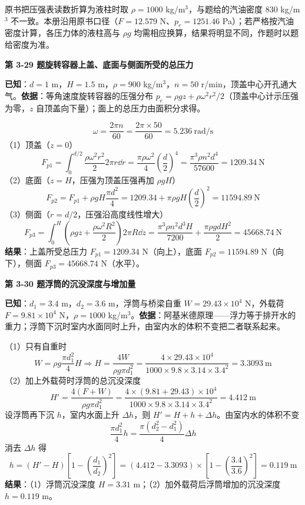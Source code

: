 \begin{yicuo}
原书把压强表读数折算为液柱时取 $\rho=1000$ kg/m$^3$，与题给的汽油密度 830 kg/m$^3$ 不一致。本册沿用原书口径（$F=12.579$ N、$p_e=1251.46$ Pa）；若严格按汽油密度计算，各压力体的液柱高与 $\rho g$ 均需相应换算，结果将明显不同，作题时以题给密度为准。
\end{yicuo}

\noindent\textbf{第 3-29 题\quad 旋转容器上盖、底面与侧面所受的总压力}

\begin{jie}
\textbf{已知}：$d=1$ m，$H=1.5$ m，$\rho=900$ kg/m$^3$，$n=50$ r/min，顶盖中心开孔通大气。\textbf{依据}：等角速度旋转容器的压强分布 $p_e=\rho gz+\rho\omega^2r^2/2$（顶盖中心计示压强为零，$z$ 自顶盖向下量）；面上的总压力由面积分求得。

\[ \omega=\frac{2\pi n}{60}=\frac{2\pi\times50}{60}=5.236\ \mathrm{rad/s} \]
（1）顶盖（$z=0$）
\[ F_{p1}=\int_0^{d/2}\frac{\rho\omega^2r^2}{2}2\pi r\dd r=\frac{\pi\rho\omega^2}{4}\left(\frac{d}{2}\right)^4=\frac{\pi^3\rho n^2d^4}{57600}=1209.34\ \mathrm{N} \]
（2）底面（$z=H$，压强为顶盖压强再加 $\rho gH$）
\[ F_{p2}=F_{p1}+\rho gH\frac{\pi d^2}{4}=1209.34+\pi\rho gH\left(\frac{d}{2}\right)^2=11594.89\ \mathrm{N} \]
（3）侧面（$r=d/2$，压强沿高度线性增大）
\[ F_{p3}=\int_0^{H}\left(\rho gz+\frac{\rho\omega^2R^2}{2}\right)2\pi R\dd z=\frac{\pi^3\rho n^2d^3H}{7200}+\frac{\pi\rho gdH^2}{2}=45668.74\ \mathrm{N} \]
\textbf{结果}：上盖所受总压力 $F_{p1}=1209.34$ N（向上），底面 $F_{p2}=11594.89$ N（向下），侧面 $F_{p3}=45668.74$ N（水平）。
\end{jie}

\noindent\textbf{第 3-30 题\quad 浮筒的沉没深度与增加量}

\begin{jie}
\textbf{已知}：$d_1=3.4$ m，$d_2=3.6$ m，浮筒与桥梁自重 $W=29.43\times10^4$ N，外载荷 $F=9.81\times10^4$ N，$\rho=1000$ kg/m$^3$。\textbf{依据}：阿基米德原理——浮力等于排开水的重力；浮筒下沉时室内水面同时上升，由室内水的体积不变把二者联系起来。

（1）只有自重时
\[ W=\rho g\frac{\pi d_1^2}{4}H\Rightarrow H=\frac{4W}{\rho g\pi d_1^2}=\frac{4\times29.43\times10^4}{1000\times9.8\times3.14\times3.4^2}=3.3093\ \mathrm{m} \]
（2）加上外载荷时浮筒的总沉没深度
\[ H'=\frac{4(F+W)}{\rho g\pi d_1^2}=\frac{4\times(9.81+29.43)\times10^4}{1000\times9.8\times3.14\times3.4^2}=4.412\ \mathrm{m} \]
设浮筒再下沉 $h$，室内水面上升 $\Delta h$，则 $H'=H+h+\Delta h$。由室内水的体积不变
\[ \frac{\pi d_1^2}{4}h=\frac{\pi(d_2^2-d_1^2)}{4}\Delta h \]
消去 $\Delta h$ 得
\[ h=(H'-H)\left[1-\left(\frac{d_1}{d_2}\right)^2\right]=(4.412-3.3093)\times\left[1-\left(\frac{3.4}{3.6}\right)^2\right]=0.119\ \mathrm{m} \]
\textbf{结果}：（1）浮筒沉没深度 $H=3.31$ m；（2）加外载荷后浮筒增加的沉没深度 $h=0.119$ m。
\end{jie}


